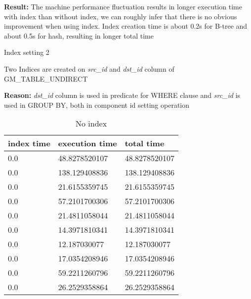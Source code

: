 \begin{itemize*}
\par \textbf{Result:} The machine performance fluctuation results in longer execution time with index than without index, we can roughly infer that there is no obvious improvement when using index. Index creation time is about 0.2s for B-tree and about 0.5s for hash, resulting in longer total time
\item{Index setting 2}
\par Two Indices are created on \textit{src\_id} and \textit{dst\_id} column of GM\_TABLE\_UNDIRECT
\par \textbf{Reason:} \textit{dst\_id} column is used in predicate for WHERE clause and \textit{src\_id} is used in GROUP BY, both in component id setting operation

\begin{table}[H]
\begin{center}
\begin{tabular}{|l|l|l|}
\hline
index time & execution time & total time     \\ \hline
0.0 & 48.8278520107 & 48.8278520107 \\ \hline
0.0 & 138.129408836 & 138.129408836 \\ \hline
0.0 & 21.6155359745 & 21.6155359745 \\ \hline
0.0 & 57.2101700306 & 57.2101700306 \\ \hline
0.0 & 21.4811058044 & 21.4811058044 \\ \hline
0.0 & 14.3971810341 & 14.3971810341 \\ \hline
0.0 & 12.187030077  & 12.187030077  \\ \hline
0.0 & 17.0354208946 & 17.0354208946 \\ \hline
0.0 & 59.2211260796 & 59.2211260796 \\ \hline
0.0 & 26.2529358864 & 26.2529358864 \\ \hline
\end{tabular}
\end{center}
\caption{No index}
\end{table}


\end{itemize*}
